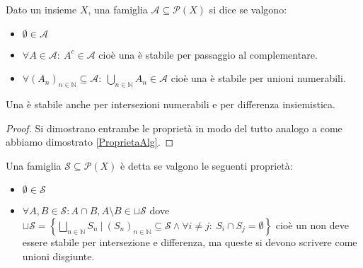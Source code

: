 \begin{definition}[\sigalg{}]
	Dato un insieme $X$, una famiglia $\mathcal A\subseteq\mathcal P (X)$ si dice \sigalg{} se valgono:
	\begin{itemize}
	\item $\emptyset\in \mathcal A$
	\item $\forall A\in \mathcal A:\ A^c\in \mathcal A$ cioè una \sigalg{} è stabile per passaggio al complementare.
	\item $\forall (A_n)_{n\in\mathbb N}\subseteq \mathcal A:\ \bigcup_{n\in\mathbb N} A_n\in \mathcal A$ cioè una \sigalg{} è stabile per unioni numerabili.  
	\end{itemize}
\end{definition}

\begin{remark}\label{ProprietaSigAlg}
	Una \sigalg{} è stabile anche per intersezioni numerabili e per differenza insiemistica.
\end{remark}
\begin{proof}
	Si dimostrano entrambe le proprietà in modo del tutto analogo a come abbiamo dimostrato \cref{ProprietaAlg}.
\end{proof}

\begin{definition}[\Semiring{}]
	Una famiglia $\mathcal S\subseteq \mathcal P(X)$ è detta \semiring{} se valgono le seguenti proprietà:
	\begin{itemize}
		\item $\emptyset\in \mathcal S$
		\item $\displaystyle\forall A,B\in \mathcal S: A\cap B, A\setminus B\in \sqcup \mathcal S$ dove
		$\displaystyle
		\sqcup{ \mathcal S }=\left\{\bigsqcup_{n\in \mathbb N} S_n\ |\ (S_n)_{n\in\mathbb N} \subseteq \mathcal S \wedge \forall i\not= j:\ S_i\cap S_j=\emptyset\right\}$ 
		cioè un \semiring{} non deve essere stabile per intersezione e differenza, ma queste si devono scrivere come unioni disgiunte.
	\end{itemize}
\end{definition}

